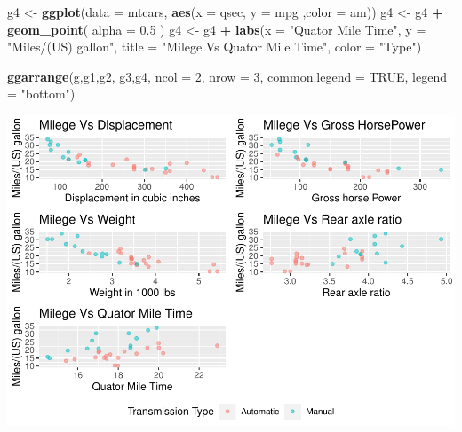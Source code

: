 \documentclass[
]{article}
\newenvironment{Shaded}{\begin{snugshade}}{\end{snugshade}}
\newcommand{\DataTypeTok}[1]{\textcolor[rgb]{0.13,0.29,0.53}{#1}}
\newcommand{\DecValTok}[1]{\textcolor[rgb]{0.00,0.00,0.81}{#1}}
\newcommand{\FloatTok}[1]{\textcolor[rgb]{0.00,0.00,0.81}{#1}}
\newcommand{\KeywordTok}[1]{\textcolor[rgb]{0.13,0.29,0.53}{\textbf{#1}}}
\newcommand{\NormalTok}[1]{#1}
\newcommand{\OperatorTok}[1]{\textcolor[rgb]{0.81,0.36,0.00}{\textbf{#1}}}
\newcommand{\OtherTok}[1]{\textcolor[rgb]{0.56,0.35,0.01}{#1}}
\newcommand{\StringTok}[1]{\textcolor[rgb]{0.31,0.60,0.02}{#1}}
\begin{document}
\begin{Shaded}
\begin{Highlighting}[]
\NormalTok{g4 <-}\StringTok{ }\KeywordTok{ggplot}\NormalTok{(}\DataTypeTok{data =}\NormalTok{ mtcars, }\KeywordTok{aes}\NormalTok{(}\DataTypeTok{x =}\NormalTok{ qsec, }\DataTypeTok{y =}\NormalTok{ mpg ,}\DataTypeTok{color =}\NormalTok{ am))}
\NormalTok{g4 <-}\StringTok{ }\NormalTok{g4 }\OperatorTok{+}\StringTok{ }\KeywordTok{geom_point}\NormalTok{( }\DataTypeTok{alpha =} \FloatTok{0.5}\NormalTok{ )}
\NormalTok{g4 <-}\StringTok{ }\NormalTok{g4 }\OperatorTok{+}\StringTok{ }\KeywordTok{labs}\NormalTok{(}\DataTypeTok{x =} \StringTok{"Quator Mile Time"}\NormalTok{, }\DataTypeTok{y =} \StringTok{"Miles/(US) gallon"}\NormalTok{, }\DataTypeTok{title =} \StringTok{"Milege Vs Quator Mile Time"}\NormalTok{, }\DataTypeTok{color =} \StringTok{"Type"}\NormalTok{)}

\KeywordTok{ggarrange}\NormalTok{(g,g1,g2, g3,g4, }\DataTypeTok{ncol =} \DecValTok{2}\NormalTok{, }\DataTypeTok{nrow =} \DecValTok{3}\NormalTok{, }
          \DataTypeTok{common.legend =} \OtherTok{TRUE}\NormalTok{, }\DataTypeTok{legend =} \StringTok{"bottom"}\NormalTok{)}
\end{Highlighting}
\end{Shaded}

\includegraphics{MotorTrendAnalysis_files/figure-latex/exploartory analysis-1.pdf}

\begin{Shaded}
\end{Shaded}
\end{document}
